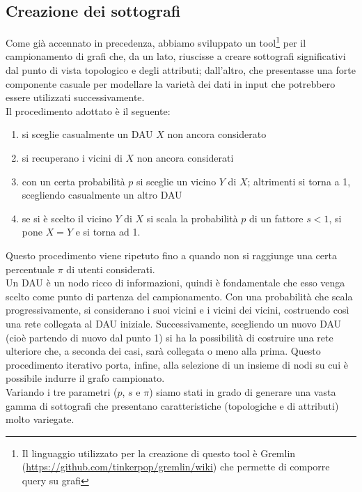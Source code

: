 \subsection{Creazione dei sottografi}
\label{sampler}
Come gi\`a accennato in precedenza, abbiamo sviluppato un tool\footnote{Il linguaggio utilizzato per la creazione di questo tool \`e Gremlin (\url{https://github.com/tinkerpop/gremlin/wiki}) che permette di comporre query su grafi} per il campionamento di grafi che, da un lato, riuscisse a creare sottografi significativi dal punto di vista topologico e degli attributi; dall'altro, che presentasse una forte componente casuale per modellare la variet\`a dei dati in input che potrebbero essere utilizzati successivamente.\\
Il procedimento adottato \`e il seguente:
\begin{enumerate}
\item si sceglie casualmente un DAU $ X $ non ancora considerato
\item si recuperano i vicini di $ X $ non ancora considerati
\item con un certa probabilit\`a $ p $ si sceglie un vicino $ Y $ di $ X $; altrimenti si torna a 1, scegliendo casualmente un altro DAU
\item se si \`e scelto il vicino $ Y $ di $ X $ si scala la probabilit\`a $ p $ di un fattore $ s < 1 $, si pone $ X = Y $ e si torna ad 1.
\end{enumerate}
Questo procedimento viene ripetuto fino a quando non si raggiunge una certa percentuale $ \pi $ di utenti considerati.\\
Un DAU \`e un nodo ricco di informazioni, quindi \`e fondamentale che esso venga scelto come punto di partenza del campionamento. Con una probabilit\`a che scala progressivamente, si considerano i suoi vicini e i vicini dei vicini, costruendo cos\`i una rete collegata al DAU iniziale. Successivamente, scegliendo un nuovo DAU (cio\`e partendo di nuovo dal punto 1) si ha la possibilit\`a di costruire una rete ulteriore che, a seconda dei casi, sar\`a collegata o meno alla prima. Questo procedimento iterativo porta, infine, alla selezione di un insieme di nodi su cui \`e possibile indurre il grafo campionato.\\
Variando i tre parametri ($ p $, $ s $ e $ \pi $) siamo stati in grado di generare una vasta gamma di sottografi che presentano caratteristiche (topologiche e di attributi) molto variegate. 

